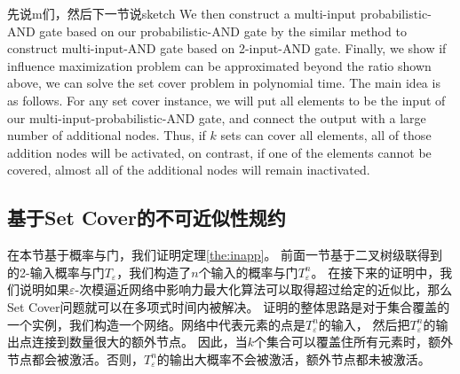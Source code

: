 先说m们，然后下一节说sketch
We then construct a multi-input probabilistic-AND gate based on our probabilistic-AND gate by the similar method to construct multi-input-AND gate based on 2-input-AND gate. Finally, we show if influence maximization problem can be approximated beyond the ratio shown above, we can solve the set cover problem in polynomial time. The main idea is as follows. For any set cover instance, we will put all elements to be the input of our multi-input-probabilistic-AND gate, and connect the output with a large number of additional nodes. Thus, if $k$ sets can cover all elements, all of those addition nodes will be activated, on contrast, if one of the elements cannot be covered, almost all of the additional nodes will remain inactivated.

\subsection{基于Set Cover的不可近似性规约}
在本节基于概率与门，我们证明定理\ref{the:inapp}。
前面一节基于二叉树级联得到的2-输入概率与门$T_\varepsilon$，我们构造了$n$个输入的概率与门$T_\varepsilon^n$。
在接下来的证明中，我们说明如果$\varepsilon$-次模逼近网络中影响力最大化算法可以取得超过给定的近似比，那么Set Cover问题就可以在多项式时间内被解决。
证明的整体思路是对于集合覆盖的一个实例，我们构造一个网络。网络中代表元素的点是$T_\varepsilon^n$的输入，
然后把$T_\varepsilon^n$的输出点连接到数量很大的额外节点。
因此，当$k$个集合可以覆盖住所有元素时，额外节点都会被激活。否则，$T_\varepsilon^n$的输出大概率不会被激活，额外节点都未被激活。
